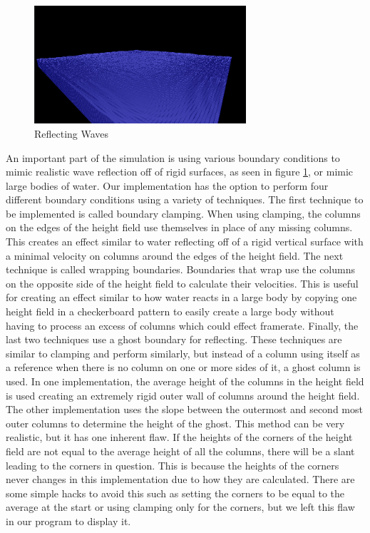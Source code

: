 \documentclass[12pt,titlepage]{article}
\begin{document}
\begin{figure}[H]
    \caption{Reflecting Waves}
    \label{fig:reflection}
    \centering
    \includegraphics[width=0.7\textwidth]{../www/images/bouncingWaves}
\end{figure}
	
An important part of the simulation is using various boundary conditions to 
mimic realistic wave reflection off of rigid surfaces, as seen in figure 
\ref{fig:reflection}, or mimic large bodies of 
water. Our implementation has the option to perform four different boundary 
conditions using a variety of techniques. The first technique to be implemented 
is called boundary clamping. When using clamping, the columns on the edges of 
the height field use themselves in place of any missing columns. This creates 
an effect similar to water reflecting off of a rigid vertical surface with a 
minimal velocity on columns around the edges of the height field. The next 
technique is called wrapping boundaries. Boundaries that wrap use the columns 
on the opposite side of the height field to calculate their velocities. This is 
useful for creating an effect similar to how water reacts in a large body by 
copying one height field in a checkerboard pattern to easily create a large 
body without having to process an excess of columns which could effect 
framerate. Finally, the last two techniques use a ghost boundary for 
reflecting. These techniques are similar to clamping and perform similarly, but 
instead of a column using itself as a reference when there is no column on one 
or more sides of it, a ghost column is used. In one implementation, the average 
height of the columns in the height field is used creating an extremely rigid 
outer wall of columns around the height field. The other implementation uses 
the slope between the outermost and second most outer columns to determine the 
height of the ghost. This method can be very realistic, but it has one inherent 
flaw. If the heights of the corners of the height field are not equal to the 
average height of all the columns, there will be a slant leading to the corners 
in question. This is because the heights of the corners never changes in this 
implementation due to how they are calculated. There are some simple hacks to 
avoid this such as setting the corners to be equal to the average at the start 
or using clamping only for the corners, but we left this flaw in our program to 
display it.
\end{document}
